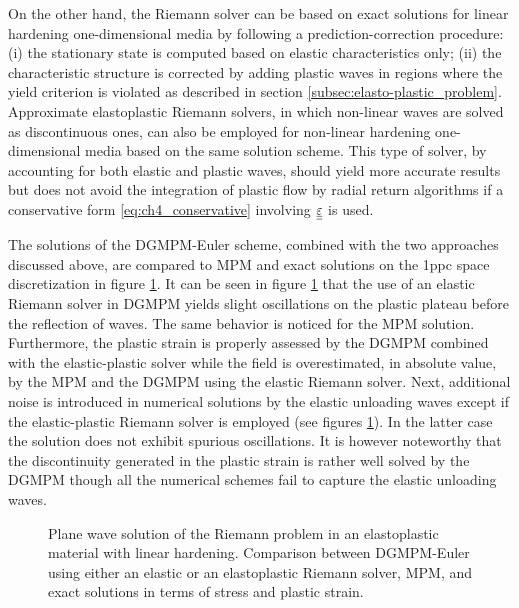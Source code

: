 On the other hand, the Riemann solver can be based on exact solutions for linear hardening one-dimensional media \cite{Thomas_EP,Wang} by following a prediction-correction procedure: (i) the stationary state is computed based on elastic characteristics only; (ii) the characteristic structure is corrected by adding plastic waves in regions where the yield criterion is violated as described in section \ref{subsec:elasto-plastic_problem}.
Approximate elastoplastic Riemann solvers, in which non-linear waves are solved as discontinuous ones, can also be employed for non-linear hardening one-dimensional media based on the same solution scheme.
This type of solver, by accounting for both elastic and plastic waves, should yield more accurate results but does not avoid the integration of plastic flow by radial return algorithms if a conservative form \eqref{eq:ch4_conservative} involving ${\underline{\underline{\varepsilon}}}$ is used.

The solutions of the DGMPM-Euler scheme, combined with the two approaches discussed above, are compared to MPM and exact solutions on the 1ppc space discretization in figure \ref{fig:RP_EP_dgmpm_mpm}.
It can be seen in figure \ref{fig:RP_EP_dgmpm_mpm} that the use of an elastic Riemann solver in DGMPM yields slight oscillations on the plastic plateau before the reflection of waves.
The same behavior is noticed for the MPM solution.
Furthermore, the plastic strain is properly assessed by the DGMPM combined with the elastic-plastic solver while the field is overestimated, in absolute value, by the MPM and the DGMPM using the elastic Riemann solver.
Next, additional noise is introduced in numerical solutions by the elastic unloading waves except if the elastic-plastic Riemann solver is employed (see figures \ref{fig:RP_EP_dgmpm_mpm}).
In the latter case the solution does not exhibit spurious oscillations.
It is however noteworthy that the discontinuity generated in the plastic strain is rather well solved by the DGMPM though all the numerical schemes fail to capture the elastic unloading waves.

\begin{figure}[h!]
  \centering
  { \label{subfig:ep_dgmpm_mpm1}}
  { \label{subfig:ep_dgmpm_mpm3}}
  {}
  \caption{Plane wave solution of the Riemann problem in an elastoplastic material with linear hardening. Comparison between DGMPM-Euler using either an elastic or an elastoplastic Riemann solver, MPM, and exact solutions in terms of stress and plastic strain.}
  \label{fig:RP_EP_dgmpm_mpm}
\end{figure}


